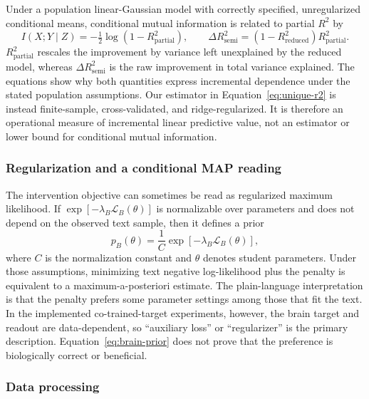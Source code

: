 Under a population linear-Gaussian model with correctly specified, unregularized conditional means, conditional mutual information is related to partial $R^2$ by
\begin{equation}
  I(X;Y\mid Z)=-\tfrac{1}{2}\log\!\left(1-R^2_{\mathrm{partial}}\right),
  \qquad
  \Delta R^2_{\mathrm{semi}}=\left(1-R^2_{\mathrm{reduced}}\right)R^2_{\mathrm{partial}} .
  \label{eq:cmi-r2}
\end{equation}
$R^2_{\mathrm{partial}}$ rescales the improvement by variance left unexplained by the reduced model, whereas $\Delta R^2_{\mathrm{semi}}$ is the raw improvement in total variance explained.
The equations show why both quantities express incremental dependence under the stated population assumptions.
Our estimator in Equation~\ref{eq:unique-r2} is instead finite-sample, cross-validated, and ridge-regularized.
It is therefore an operational measure of incremental linear predictive value, not an estimator or lower bound for conditional mutual information.

\subsubsection{Regularization and a conditional MAP reading}

The intervention objective can sometimes be read as regularized maximum likelihood.
If $\exp[-\lambda_B\mathcal{L}_B(\theta)]$ is normalizable over parameters and does not depend on the observed text sample, then it defines a prior
\begin{equation}
  p_B(\theta)=\frac{1}{C}\exp\!\left[-\lambda_B\mathcal{L}_B(\theta)\right],
  \label{eq:brain-prior}
\end{equation}
where $C$ is the normalization constant and $\theta$ denotes student parameters.
Under those assumptions, minimizing text negative log-likelihood plus the penalty is equivalent to a maximum-a-posteriori estimate.
The plain-language interpretation is that the penalty prefers some parameter settings among those that fit the text.
In the implemented co-trained-target experiments, however, the brain target and readout are data-dependent, so ``auxiliary loss'' or ``regularizer'' is the primary description.
Equation~\ref{eq:brain-prior} does not prove that the preference is biologically correct or beneficial.

\subsubsection{Data processing}

